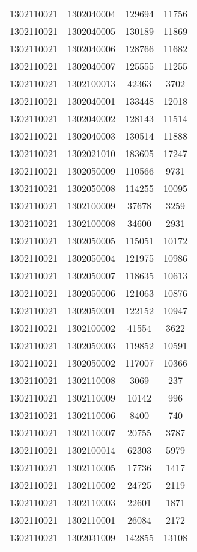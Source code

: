 \begin{longtable}[h]{llcc}
		1302110021 & 1302040004 & 129694 & 11756\\
		1302110021 & 1302040005 & 130189 & 11869\\
		1302110021 & 1302040006 & 128766 & 11682\\
		1302110021 & 1302040007 & 125555 & 11255\\
		1302110021 & 1302100013 & 42363 & 3702\\
		1302110021 & 1302040001 & 133448 & 12018\\
		1302110021 & 1302040002 & 128143 & 11514\\
		1302110021 & 1302040003 & 130514 & 11888\\
		1302110021 & 1302021010 & 183605 & 17247\\
		1302110021 & 1302050009 & 110566 & 9731\\
		1302110021 & 1302050008 & 114255 & 10095\\
		1302110021 & 1302100009 & 37678 & 3259\\
		1302110021 & 1302100008 & 34600 & 2931\\
		1302110021 & 1302050005 & 115051 & 10172\\
		1302110021 & 1302050004 & 121975 & 10986\\
		1302110021 & 1302050007 & 118635 & 10613\\
		1302110021 & 1302050006 & 121063 & 10876\\
		1302110021 & 1302050001 & 122152 & 10947\\
		1302110021 & 1302100002 & 41554 & 3622\\
		1302110021 & 1302050003 & 119852 & 10591\\
		1302110021 & 1302050002 & 117007 & 10366\\
		1302110021 & 1302110008 & 3069 & 237\\
		1302110021 & 1302110009 & 10142 & 996\\
		1302110021 & 1302110006 & 8400 & 740\\
		1302110021 & 1302110007 & 20755 & 3787\\
		1302110021 & 1302100014 & 62303 & 5979\\
		1302110021 & 1302110005 & 17736 & 1417\\
		1302110021 & 1302110002 & 24725 & 2119\\
		1302110021 & 1302110003 & 22601 & 1871\\
		1302110021 & 1302110001 & 26084 & 2172\\
		1302110021 & 1302031009 & 142855 & 13108\\

\end{longtable}
